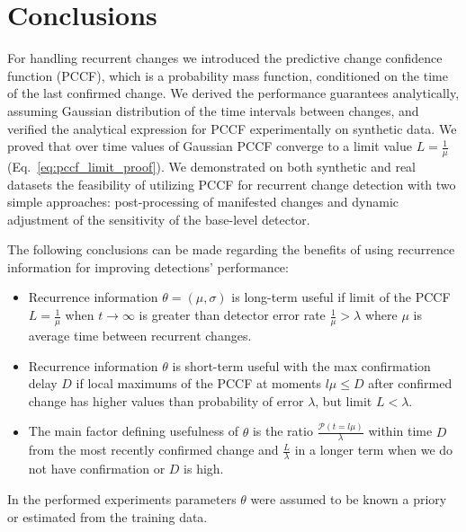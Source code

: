 \section{Conclusions}
\label{sec:conclusions}
For handling recurrent changes we introduced the predictive change confidence function (PCCF), which is a probability mass function, conditioned on the time of the last confirmed change.
We derived the performance guarantees analytically, assuming Gaussian distribution of the time intervals between changes, and verified the analytical expression for PCCF experimentally on synthetic data.
We proved that over time values of Gaussian PCCF converge to a limit value $L = \frac{1}{\mu}$ (Eq.~\ref{eq:pccf_limit_proof}).
We demonstrated on both synthetic and real datasets the feasibility of utilizing PCCF for recurrent change detection with two simple approaches: post-processing of manifested changes and dynamic adjustment of the sensitivity of the base-level detector.

The following conclusions can be made regarding the benefits of using recurrence information for improving detections' performance:
\begin{itemize}
  \item Recurrence information $\theta=(\mu, \sigma)$ is long-term useful if limit of the PCCF $L = \frac{1}{\mu}$ when $t \to \infty$ is greater than detector error rate $\frac{1}{\mu} > \lambda$ where $\mu$ is average time between recurrent changes.
  \item Recurrence information $\theta$ is short-term useful with the max confirmation delay $D$ if local maximums of the PCCF at moments $l \mu \leq D$ after confirmed change has higher values than probability of error $\lambda$,
      but limit $L < \lambda$.
  \item The main factor defining usefulness of $\theta$ is the ratio $\frac{\mathcal{P}(t = l \mu)}{\lambda}$ within time $D$ from the most recently confirmed change and $\frac{L}{\lambda}$ in a longer term when we do not have confirmation or $D$ is high.
\end{itemize}
In the performed experiments parameters $\theta$ were assumed to be known a priory or estimated from the training data.


